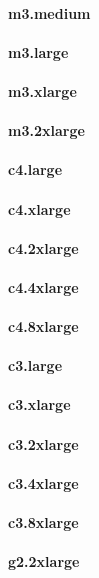 \documentclass{acm_proc_article-sp}
\begin{document}
\paragraph{m3.medium}
\paragraph{m3.large}
\paragraph{m3.xlarge}
\paragraph{m3.2xlarge}
\paragraph{c4.large}
\paragraph{c4.xlarge}
\paragraph{c4.2xlarge}
\paragraph{c4.4xlarge}
\paragraph{c4.8xlarge}
\paragraph{c3.large}
\paragraph{c3.xlarge}
\paragraph{c3.2xlarge}
\paragraph{c3.4xlarge}
\paragraph{c3.8xlarge}
\paragraph{g2.2xlarge}
\end{document}
